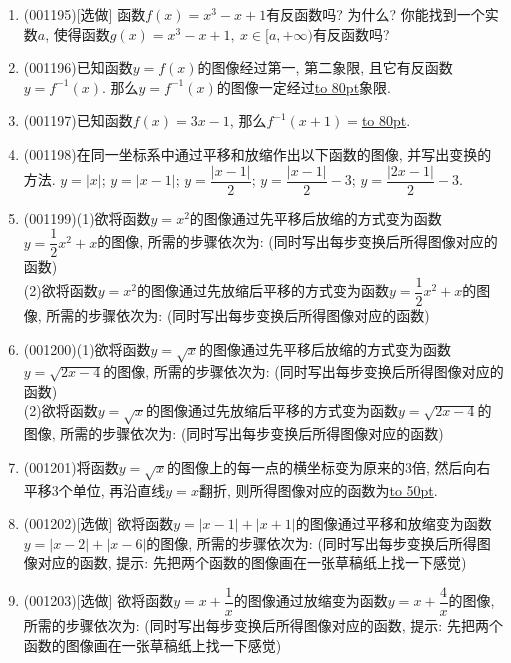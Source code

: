 \documentclass[10pt,a4paper]{article}
\newcommand{\blank}[1]{\underline{\hbox to #1pt{}}}
\begin{document}
\begin{enumerate}[1.]
\item {\tiny (001195)}[选做]
函数$f(x)=x^3-x+1$有反函数吗? 为什么? 你能找到一个实数$a$, 使得函数$g(x)=x^3-x+1, \ x \in [a,+\infty)$有反函数吗?
\item {\tiny (001196)}已知函数$y=f(x)$的图像经过第一, 第二象限, 且它有反函数$y=f^{-1}(x)$. 那么$y=f^{-1}(x)$的图像一定经过\blank{80}象限.
\item {\tiny (001197)}已知函数$f(x)=3x-1$, 那么$f^{-1}(x+1)=$\blank{80}.
\item {\tiny (001198)}在同一坐标系中通过平移和放缩作出以下函数的图像, 并写出变换的方法.
$y=|x|$; $y=|x-1|$; $y=\dfrac{|x-1|}2$; $y=\dfrac{|x-1|}2-3$; $y=\dfrac{|2x-1|}2-3$.
\begin{center}
\end{center}
\item {\tiny (001199)}(1)欲将函数$y=x^2$的图像通过先平移后放缩的方式变为函数$y=\dfrac{1}{2}x^2+x$的图像, 所需的步骤依次为: (同时写出每步变换后所得图像对应的函数)\\ 
(2)欲将函数$y=x^2$的图像通过先放缩后平移的方式变为函数$y=\dfrac{1}{2}x^2+x$的图像, 所需的步骤依次为: (同时写出每步变换后所得图像对应的函数)
\item {\tiny (001200)}(1)欲将函数$y=\sqrt{x}$的图像通过先平移后放缩的方式变为函数$y=\sqrt{2x-4}$的图像, 所需的步骤依次为: (同时写出每步变换后所得图像对应的函数)\\ 
(2)欲将函数$y=\sqrt{x}$的图像通过先放缩后平移的方式变为函数$y=\sqrt{2x-4}$的图像, 所需的步骤依次为: (同时写出每步变换后所得图像对应的函数)
\item {\tiny (001201)}将函数$y=\sqrt{x}$的图像上的每一点的横坐标变为原来的$3$倍, 然后向右平移$3$个单位, 再沿直线$y=x$翻折, 则所得图像对应的函数为\blank{50}.
\item {\tiny (001202)}[选做]
欲将函数$y=|x-1|+|x+1|$的图像通过平移和放缩变为函数$y=|x-2|+|x-6|$的图像, 所需的步骤依次为: (同时写出每步变换后所得图像对应的函数, 提示: 先把两个函数的图像画在一张草稿纸上找一下感觉)
\item {\tiny (001203)}[选做]
欲将函数$y=x+\dfrac{1}{x}$的图像通过放缩变为函数$y=x+\dfrac{4}{x}$的图像, 所需的步骤依次为: (同时写出每步变换后所得图像对应的函数, 提示: 先把两个函数的图像画在一张草稿纸上找一下感觉)

\end{enumerate}
\end{document}
